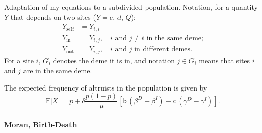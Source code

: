 \documentclass[11pt, letterpaper]{article}
\newcommand{\Esp}[1]{\mathbb{E}\big[ #1\big]}%
\newcommand{\bb}{\mathsf{b}}
\newcommand{\cc}{\mathsf{c}}
\begin{document}
Adaptation of my equations to a subdivided population. Notation, for a quantity $Y$ that depends on two sites ($Y=e$, $d$, $Q$):
\begin{subequations}
\begin{align}
Y_{\textrm{self}} &= Y_{i,i} \\
%
Y_{\textrm{in}} &= Y_{i,j}, \quad \textrm{$i$ and $j\neq i$ in the same deme;}\\
%
Y_{\textrm{out}} &= Y_{i,j}, \quad \textrm{$i$ and $j$ in different demes.}
\end{align}
\end{subequations}
For a site $i$, $G_i$ denotes the deme it is in, and notation $j \in G_i$ means that sites $i$ and $j$ are in the same deme. 

The expected frequency of altruists in the population is given by 
\begin{equation}
\Esp{\overline{X}} = p + \delta \frac{p (1-p)}{\mu} \left[ \bb \, (\beta^{D} - \beta^{I}) - \cc \, (\gamma^{D} - \gamma^{I}) \right].
\end{equation}

\paragraph{Moran, Birth-Death}
\end{document}
